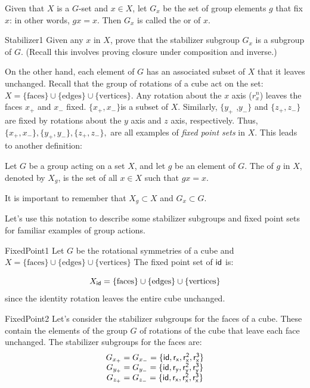\begin {defn}\label {StabilizerSubgroups} 
Given that $X$ is a $G$-set and  $x \in X$, let $G_x$ be the set of  group elements $g$ that fix $x$:  in other words, $gx=x$.  Then $G_x$ is called the  or  of $x$.
\end{defn}

\begin {exercise}{Stabilizer1}
Given any $x$ in $X$, prove that the stabilizer subgroup $G_x$  is a subgroup of $G$.  (Recall this involves proving closure under composition and inverse.)
\end {exercise}

On the other hand, each element of $G$ has an associated subset of $X$ that it leaves unchanged. 
Recall that the group of rotations of a cube act on the set:   $X=\{\text{faces}\}\cup\{\text{edges}\}\cup\{\text{vertices}\}$.  Any rotation about the $x$ axis ($r_x^n$) leaves the faces $x_+$ and $x_-$ fixed.   $\{x_+,x_-\}$is a subset of $X$. Similarly, $\{y_+$ ,$y_-\}$ and $\{z_+,z_-\}$ are  fixed by rotations about the $y$ axis and $z$ axis, respectively.   Thus, $\{x_+,x_-\},\{y_+,y_-\},\{z_+,z_-\},$  are all examples of \emph{fixed point sets} in $X$.
This leads to another definition:

\begin{defn} \label {FixedPoint}
Let $G$ be a group acting on a set $X$, and let $g$ be
an element of $G$. The  of $g$ in $X$, denoted by $X_g$, is the set of 
all $x \in X$ such that $gx = x$.
\end{defn}
\noindent
It is important to remember that $X_g \subset X$ and $G_x \subset G$. 

Let's use this notation to describe some stabilizer subgroups and fixed point sets for familiar examples of group actions.

\begin {example}{FixedPoint1}
Let $G$ be the rotational symmetries of a cube and $X=\{\text{faces}\}\cup\{\text{edges}\}\cup\{\text{vertices}\}$
The fixed point set of $\sf{id}$ is: 

$$X_{\sf{id}}=\{\text{faces}\}\cup\{\text{edges}\}\cup\{\text{vertices}\}$$
since the identity rotation  leaves the entire cube unchanged.  
\end {example}

\begin {example}{FixedPoint2}
Let's consider the stabilizer subgroups for the faces of a cube.  These contain the elements of the group $G$ of rotations of the cube that leave each face unchanged.  The stabilizer subgroups for the faces are:
$$\begin {array} {c}
G_{x_+}=G_{x_-}=\{\sf{id},r_x,r_x^2,r_x^3\}\\
G_{y_+}=G_{y_-}=\{\sf{id},r_y,r_y^2,r_y^3\}\\
G_{z_+}=G_{z_-}=\{\sf{id},r_x,r_x^2,r_x^3\}
\end {array}$$
\end{example}

